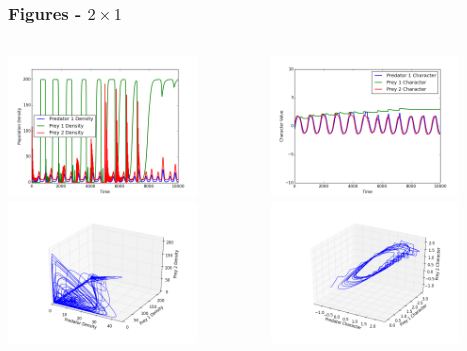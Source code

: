 \documentclass[10pt]{beamer}
\begin{document}
\begin{frame}
	\frametitle{Figures - $2\times1$}
	\begin{columns}[t]
		\begin{column}{.5\textwidth}
			\centering
			\includegraphics[width=5cm,height=3.75cm]{figures/1x2/variable_growth/densities_stable_domination.png}\\
			\includegraphics[width=5cm,height=3.75cm]{figures/1x2/variable_growth/density_phase_plane_stable_domination.png}
		\end{column}
		\begin{column}{.5\textwidth}
			\centering
			\includegraphics[width=5cm,height=3.75cm]{figures/1x2/variable_growth/traits_stable_domination.png}\\
			\includegraphics[width=5cm,height=3.75cm]{figures/1x2/variable_growth/trait_phase_plane_stable_domination.png}
		\end{column}
	\end{columns}
\end{frame}
\end{document}
